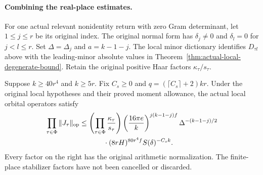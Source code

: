 \paragraph{Combining the real-place estimates.}
For one actual relevant nonidentity return with zero Gram
determinant, let $1\le j\le r$ be its original index.  The
original normal form has $\delta_j\ne0$ and
$\delta_l=0$ for $j<l\le r$.  Set $\Delta=\Delta_j$ and
$a=k-1-j$.  The local minor dictionary identifies $D_{\tau l}$
above with the leading-minor absolute values in
Theorem~\ref{thm:actual-local-degenerate-bound}.
Retain the original positive Haar factors $\kappa_\tau/s_\tau$.

\begin{theorem}
\label{thm:actual-degenerate-product}
Suppose $k\ge40r^4$ and $k\ge5r$.  Fix $C_s\ge0$ and
$q=(\lceil C_s\rceil+2)kr$.  Under the original local hypotheses
and their proved moment allowance, the actual local orbital
operators satisfy
\begin{align}
 \prod_{\tau\in\Phi}\|J_\tau\|_{\mathrm{op}}
 &\le\left(\prod_{\tau\in\Phi}\frac{\kappa_\tau}{s_\tau}\right)
       \left(\frac{16\pi e}{k}\right)^{j(k-1-j)f}
       \Delta^{-(k-1-j)/2}\notag\\
 &\hspace{12mm}\cdot(8rH)^{80r^4f}S(\delta)^{-C_sk}.
 \label{eq:actual-degenerate-product}
\end{align}
Every factor on the right has the original arithmetic
normalization.  The finite-place stabilizer factors have not
been cancelled or discarded.
\end{theorem}

